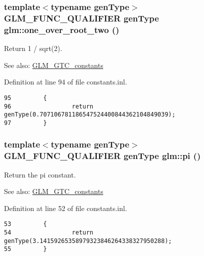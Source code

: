 \hypertarget{group__gtc__constants_g59e3cc61460e0c503d80df6e70aa38b0}{
\subsubsection[one\_\-over\_\-root\_\-two]{\setlength{\rightskip}{0pt plus 5cm}template$<$typename genType$>$ GLM\_\-FUNC\_\-QUALIFIER genType glm::one\_\-over\_\-root\_\-two ()}}
\label{group__gtc__constants_g59e3cc61460e0c503d80df6e70aa38b0}


Return 1 / sqrt(2). \begin{Desc}
\item[See also:]\hyperlink{group__gtc__constants}{GLM\_\-GTC\_\-constants} \end{Desc}


Definition at line 94 of file constants.inl.

\begin{Code}\begin{verbatim}95         {
96                 return genType(0.707106781186547524400844362104849039);
97         }
\end{verbatim}
\end{Code}


\hypertarget{group__gtc__constants_g7e73289d56099ea4789c597750dc68b8}{
\subsubsection[pi]{\setlength{\rightskip}{0pt plus 5cm}template$<$typename genType$>$ GLM\_\-FUNC\_\-QUALIFIER genType glm::pi ()}}
\label{group__gtc__constants_g7e73289d56099ea4789c597750dc68b8}


Return the pi constant. \begin{Desc}
\item[See also:]\hyperlink{group__gtc__constants}{GLM\_\-GTC\_\-constants} \end{Desc}


Definition at line 52 of file constants.inl.

\begin{Code}\begin{verbatim}53         {
54                 return genType(3.14159265358979323846264338327950288);
55         }
\end{verbatim}
\end{Code}



